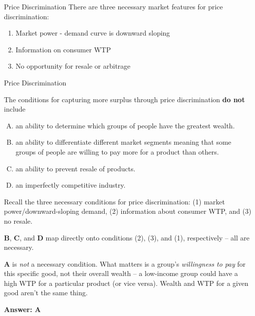 \documentclass{beamer}
\begin{document}
\begin{frame}{Price Discrimination}
  There are three necessary market features for price discrimination:

  \begin{enumerate}
    \item Market power - demand curve is downward sloping
    
    \item Information on consumer WTP
    
    \item No opportunity for resale or arbitrage
  \end{enumerate}
\end{frame}

\begin{frame}{Price Discrimination}


  The conditions for capturing more surplus through price discrimination \textbf{do not} include

  \begin{enumerate}[A)]
    \item an ability to determine which groups of people have the greatest wealth.
    \item an ability to differentiate different market segments meaning that some groups of people are willing to pay more for a product than others.
    \item an ability to prevent resale of products.
    \item an imperfectly competitive industry.
  \end{enumerate}
\end{frame}

\begin{frame}

  \bigskip
  Recall the three necessary conditions for price discrimination: (1) market power/downward-sloping demand, (2) information about consumer WTP, and (3) no resale.

  \bigskip
  \textbf{B}, \textbf{C}, and \textbf{D} map directly onto conditions (2), (3), and (1), respectively -- all are necessary.

  \bigskip
  \textbf{A} is \emph{not} a necessary condition. What matters is a group's \emph{willingness to pay} for this specific good, not their overall wealth -- a low-income group could have a high WTP for a particular product (or vice versa). Wealth and WTP for a given good aren't the same thing.

  \bigskip
  \textbf{Answer: A}
\end{frame}
\end{document}
